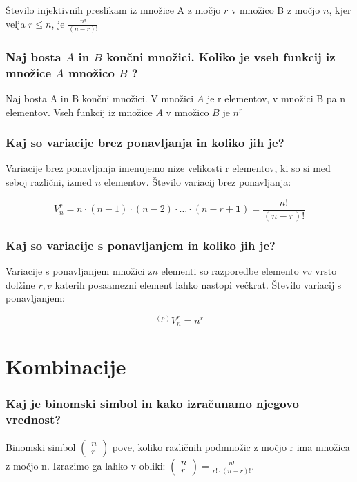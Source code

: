 \documentclass{article}
\begin{document}
Število injektivnih preslikam iz množice A z močjo $r$ v množico B z močjo $n$, kjer velja $r \leq n$, je $\frac{n !}{(n-r) !}$

\subsubsection*{Naj bosta $A$ in $B$ končni množici. Koliko je vseh funkcij iz množice $A $ množico $B$ ?}

Naj bosta A in B končni množici. V množici $A$ je r elementov, v množici B pa n elementov. Vseh funkcij iz množice $A$ v množico $B$ je $n^{r}$

\subsubsection*{Kaj so variacije brez ponavljanja in koliko jih je?}

Variacije brez ponavljanja imenujemo nize velikosti r elementov, ki so si med seboj različni, izmed $n$ elementov. Število variacij brez ponavljanja:

$$
V_{n}^{r}=n \cdot(n-1) \cdot(n-2) \cdot \ldots \cdot(n-r+\mathbf{1})=\frac{n !}{(n-r) !}
$$

\subsubsection*{Kaj so variacije s ponavljanjem in koliko jih je?}

Variacije s ponavljanjem množici $\mathrm{z} n$ elementi so razporedbe elemento $\mathrm{v} v$ vrsto dolžine $r, v$ katerih posaamezni element lahko nastopi večkrat. Število variacij s ponavljanjem:

$$
{ }^{(p)} V_{n}^{r}=n^{r}
$$


\section{Kombinacije}
\subsubsection*{Kaj je binomski simbol in kako izračunamo njegovo vrednost?}

Binomski simbol $\left(\begin{array}{l}n \\ r\end{array}\right)$ pove, koliko različnih podmnožic z močjo r ima množica z močjo n. Izrazimo ga lahko v obliki: $\left(\begin{array}{l}n \\ r\end{array}\right)=\frac{n !}{r ! \cdot(n-r) !}$.
\end{document}
